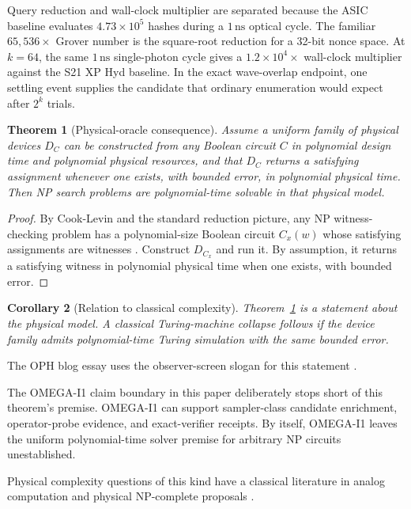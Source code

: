 \documentclass[11pt]{article}
\newtheorem{theorem}{Theorem}[section]
\newtheorem{corollary}[theorem]{Corollary}
\theoremstyle{definition}
\theoremstyle{remark}
\begin{document}
Query reduction and wall-clock multiplier are separated because the ASIC
baseline evaluates \(4.73\times10^5\) hashes during a \(1\,\mathrm{ns}\) optical
cycle. The familiar \(65{,}536\times\) Grover number is the square-root
reduction for a 32-bit nonce space. At \(k=64\), the same \(1\,\mathrm{ns}\)
single-photon cycle gives a \(1.2\times10^4\times\) wall-clock multiplier
against the S21 XP Hyd baseline. In the exact wave-overlap endpoint, one
settling event supplies the candidate that ordinary enumeration would expect
after \(2^k\) trials.

\begin{theorem}[Physical-oracle consequence]
\label{thm:oracle}
Assume a uniform family of physical devices \(D_C\) can be constructed from any
Boolean circuit \(C\) in polynomial design time and polynomial physical
resources, and that \(D_C\) returns a satisfying assignment whenever one exists,
with bounded error, in polynomial physical time. Then NP search problems are
polynomial-time solvable in that physical model.
\end{theorem}

\begin{proof}
By Cook-Levin and the standard reduction picture, any NP witness-checking
problem has a polynomial-size Boolean circuit \(C_x(w)\) whose satisfying
assignments are witnesses \cite{Cook1971,Karp1972}.
Construct \(D_{C_x}\) and run it. By assumption, it returns a satisfying
witness in polynomial physical time when one exists, with bounded error.
\end{proof}

\begin{corollary}[Relation to classical complexity]
Theorem~\ref{thm:oracle} is a statement about the physical model. A classical
Turing-machine collapse follows if the device family admits polynomial-time
Turing simulation with the same bounded error.
\end{corollary}

The OPH blog essay uses the observer-screen slogan for this statement
\cite{OPHBlogPNP}.

The OMEGA-I1 claim boundary in this paper deliberately stops short of this
theorem's premise.
OMEGA-I1 can support sampler-class candidate enrichment, operator-probe
evidence, and exact-verifier receipts. By itself, OMEGA-I1 leaves the uniform
polynomial-time solver premise for arbitrary NP circuits unestablished.

Physical complexity questions of this kind have a classical literature in
analog computation and physical NP-complete proposals
\cite{VergisSteiglitzDickinson1986,Aaronson2005}.
\end{document}
